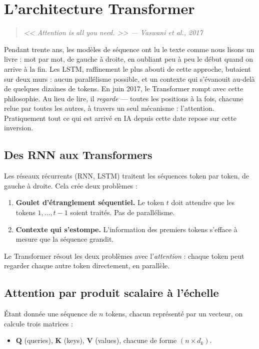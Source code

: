 \chapter{L'architecture Transformer}
\label{ch:transformers}

\begin{quote}
\emph{<< Attention is all you need. >> --- Vaswani et al., 2017}
\end{quote}

Pendant trente ans, les modèles de séquence ont lu le texte comme nous lisons un livre : mot par mot, de gauche à droite, en oubliant peu à peu le début quand on arrive à la fin. Les LSTM, raffinement le plus abouti de cette approche, butaient sur deux murs : aucun parallélisme possible, et un contexte qui s'évanouit au-delà de quelques dizaines de tokens. En juin 2017, le Transformer rompt avec cette philosophie. Au lieu de lire, il \emph{regarde} --- toutes les positions à la fois, chacune relue par toutes les autres, à travers un seul mécanisme : l'attention. Pratiquement tout ce qui est arrivé en IA depuis cette date repose sur cette inversion.
\section{Des RNN aux Transformers}

Les r\'eseaux r\'ecurrents (RNN, LSTM) traitent les s\'equences token par token, de gauche \`a droite. Cela cr\'ee deux probl\`emes :
\begin{enumerate}
  \item \textbf{Goulet d'\'etranglement s\'equentiel.} Le token $t$ doit attendre que les tokens $1, \ldots, t-1$ soient trait\'es. Pas de parall\'elisme.
  \item \textbf{Contexte qui s'estompe.} L'information des premiers tokens s'efface \`a mesure que la s\'equence grandit.
\end{enumerate}

Le Transformer r\'esout les deux probl\`emes avec l'\emph{attention} : chaque token peut regarder chaque autre token directement, en parall\`ele.

\section{Attention par produit scalaire \`a l'\'echelle}

\'Etant donn\'ee une s\'equence de $n$ tokens, chacun repr\'esent\'e par un vecteur, on calcule trois matrices :
\begin{itemize}
  \item $\mathbf{Q}$ (queries), $\mathbf{K}$ (keys), $\mathbf{V}$ (values), chacune de forme $(n \times d_k)$.
\end{itemize}

